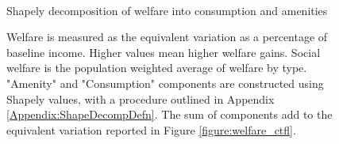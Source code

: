 \documentclass[12pt]{article}
\begin{document}
	\begin{figure}[htbp!]
		\begin{center}
			\caption{ \\ Shapely decomposition of welfare into consumption and amenities}\label{figure:welfareDecomp_ctfl}
		\end{center}
		\caption*{Welfare is measured as the equivalent variation as a percentage of baseline income. Higher values mean higher welfare gains. Social welfare is the population weighted average of welfare by type. "Amenity" and "Consumption" components are constructed using Shapely values, with a procedure outlined in Appendix \ref{Appendix:ShapeDecompDefn}. The sum of components add to the equivalent variation reported in Figure \ref{figure:welfare_ctfl}. }
	\end{figure}
	
	
	
\end{document}
